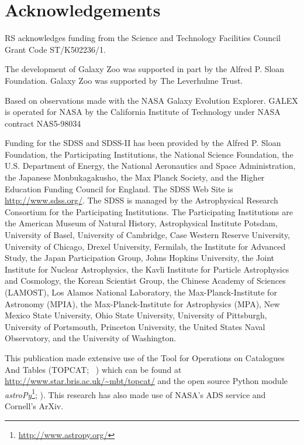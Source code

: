 \documentclass[useAMS,usenatbib]{mn2e}
\begin{document}
\section*{Acknowledgements}

RS acknowledges funding from the Science and Technology Facilities Council Grant Code ST/K502236/1. 

The development of Galaxy Zoo was supported in part by the Alfred P. Sloan Foundation. Galaxy Zoo was supported by The Leverhulme Trust. 

Based on observations made with the NASA Galaxy Evolution Explorer.  GALEX is operated for NASA by the California Institute of Technology under NASA contract NAS5-98034

Funding for the SDSS and SDSS-II has been provided by the Alfred P. Sloan Foundation, the Participating Institutions, the National Science Foundation, the U.S. Department of Energy, the National Aeronautics and Space Administration, the Japanese Monbukagakusho, the Max Planck Society, and the Higher Education Funding Council for England. The SDSS Web Site is \url{http://www.sdss.org/}.
The SDSS is managed by the Astrophysical Research Consortium for the Participating Institutions. The Participating Institutions are the American Museum of Natural History, Astrophysical Institute Potsdam, University of Basel, University of Cambridge, Case Western Reserve University, University of Chicago, Drexel University, Fermilab, the Institute for Advanced Study, the Japan Participation Group, Johns Hopkins University, the Joint Institute for Nuclear Astrophysics, the Kavli Institute for Particle Astrophysics and Cosmology, the Korean Scientist Group, the Chinese Academy of Sciences (LAMOST), Los Alamos National Laboratory, the Max-Planck-Institute for Astronomy (MPIA), the Max-Planck-Institute for Astrophysics (MPA), New Mexico State University, Ohio State University, University of Pittsburgh, University of Portsmouth, Princeton University, the United States Naval Observatory, and the University of Washington.

This publication made extensive use of the Tool for Operations on Catalogues And Tables (TOPCAT; ~\citealt{taylor05}) which can be found at \url{http://www.star.bris.ac.uk/~mbt/topcat/} and the open source Python module \emph{astroPy}\footnote{\url{http://www.astropy.org/}}; \citealt{astropy13}). This research has also made use of NASA's ADS service and Cornell's ArXiv. 



  
\end{document}
